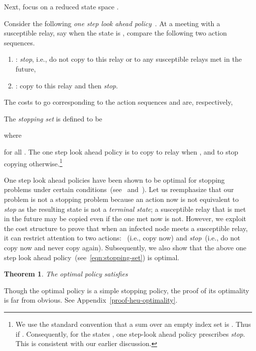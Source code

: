\documentclass[10pt,journal,letterpaper]{IEEEtran}
\newtheorem{theorem}{Theorem}[section]
\newcommand{\remove}[1]{}
\begin{document}
Next, focus on a reduced state space .
 \remove{ We cast the problem as a {\it stopping
problem}~\cite[Section~3.4]{stochctrl.bertsekas07dpoc-vol2}. Towards
this, we define an special  action which implies that no
copying is done to the susceptible relay met at present or those to
be met in the future. Alternatively,  is equivalent to a sequence
of actions .
Clearly, if we choose
action  at a state , the stopping cost, ,
is the expected time to go until the desired fraction of
destinations are infected. It can be easily verified that, for all
,

The one-step stopping set is defined as

where, as before,  and  denote the random disturbance and
the next state, respectively.
}
Consider the following {\it one step look
ahead policy}~\cite[Section~3.4]{stochctrl.bertsekas07dpoc-vol2}. At
a meeting with a susceptible relay, say when the state is , compare
the following two action sequences.
\begin{enumerate}
\item : {\it stop}, i.e., do not copy to this relay or to any susceptible relays met in the future,
\item : copy to this relay and then {\it stop}.
\end{enumerate}
The costs to go corresponding to the action sequences
 and  are, respectively,

The {\it stopping set}  is defined to be

where

for all .
The one step look ahead policy is to copy to relay
when , and to stop copying otherwise.\footnote{We use the standard convention that a sum over an
empty index set is . Thus  if . Consequently, for the states , one step-look ahead
policy prescribes {\it stop}. This is consistent with our earlier discussion.}


One step look ahead policies have been shown to be optimal for
stopping problems under certain
conditions~(see~\cite[Section~4.4]{stochctrl.bertsekas05dpoc-vol1}
and~\cite[Section~3.4]{stochctrl.bertsekas07dpoc-vol2}).
Let us reemphasize that our problem is not a stopping problem because an action  now
is not equivalent to {\it stop} as the resulting state
is not a {\it terminal state};  a susceptible relay that is met in
the future may be copied even if the one met now is not.
However, we exploit the cost structure to prove that when an infected node meets a susceptible relay,
it can restrict attention to two actions: ~(i.e., copy now) and \emph{stop}~(i.e., do not
copy now and never copy again).
Subsequently, we also show that the above one step look ahead policy~(see~\eqref{eqn:stopping-set}) is optimal.
\begin{theorem}
\label{heu-optimality} The optimal policy  satisfies

\end{theorem}
\begin{IEEEproof}
Though the optimal policy is a simple stopping policy, the proof of its optimality is far from obvious. 
See Appendix~\ref{proof-heu-optimality}.
\end{IEEEproof}
\end{document}
